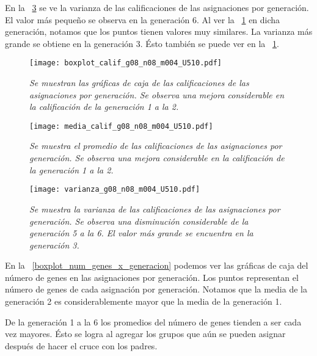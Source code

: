 En la \figurename{~\ref{var_calif_x_generacion}} se ve la varianza de las calificaciones de las asignaciones por generación. El valor más pequeño se observa en la generación 6. Al ver la \figurename{~\ref{boxplot_calif_x_generacion}} en dicha generación, notamos que los puntos tienen valores muy similares. La varianza más grande se obtiene en la generación 3. Ésto también se puede ver en la \figurename{~\ref{boxplot_calif_x_generacion}}.


\begin{figure}[H]
\centering
\texttt{[image: boxplot\_calif\_g08\_n08\_m004\_U510.pdf]} %
\caption[\textit{Gráficas de caja de calificaciones de asignaciones por generación}]{\textit{Se muestran las gráficas de caja de las calificaciones de las asignaciones por generación. Se observa una mejora considerable en la calificación de la generación 1 a la 2.}}\label{boxplot_calif_x_generacion}
\end{figure}

\begin{figure}[H]
\centering
\texttt{[image: media\_calif\_g08\_n08\_m004\_U510.pdf]} %
\caption[\textit{Media de calificaciones de asignaciones por generación}]{\textit{Se muestra el promedio de las calificaciones de las asignaciones por generación. Se observa una mejora considerable en la calificación de la generación 1 a la 2.}}\label{media_calif_x_generacion}
\end{figure}


\begin{figure}[H]
\centering
\texttt{[image: varianza\_g08\_n08\_m004\_U510.pdf]} %
\caption[\textit{Varianza de calificaciones de asignaciones por generación}]{\textit{Se muestra la varianza de las calificaciones de las asignaciones por generación. Se observa una disminución considerable de la generación 5 a la 6. El valor más grande se encuentra en la generación 3.}}\label{var_calif_x_generacion}
\end{figure}

En la \figurename{~\ref{boxplot_num_genes_x_generacion}} podemos ver las gráficas de caja del número de genes en las asignaciones por generación. Los puntos representan el número de genes de cada asignación por generación. Notamos que la media de la generación 2 es considerablemente mayor que la media de la generación 1.

De la generación 1 a la 6 los promedios del número de genes tienden a ser cada vez mayores. Ésto se logra al agregar los grupos que aún se pueden asignar después de hacer el cruce con los padres.

